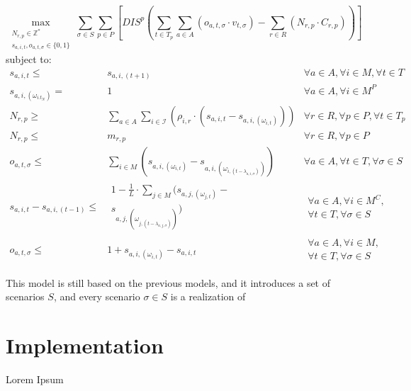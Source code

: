 \documentclass[a4paper,12pt]{article}
\begin{document}
\small
\begin{equation}
	\max_{\substack{N_{r,p} \in \mathbb{Z}^* \\ 
	s_{a,i,t}, o_{a,t,\sigma} \in \{0, 1\}}} 
	\sum_{\sigma \in S} \sum_{p \in P} [ DIS^p (\sum_{t\in T_p} \sum_{a \in A} (o_{a,t,\sigma} \cdot v_{t,\sigma})  - \sum_{r\in R} (N_{r,p} \cdot C_{r,p})) ]
\end{equation}
subject to:
\begin{align}
s_{a,i,t} \leq& s_{a,i,(t+1)}																& \forall a \in A, \forall i \in M, \forall t \in T		\\
s_{a,i,(\omega_{i.t_N})} =& 1																& \forall a \in A, \forall i \in M^P				\\
N_{r,p} \geq& \sum_{a\in A} \sum_{i\in \mathcal{I}} (\rho_{i,r} \cdot (s_{a,i,t} - s_{a,i,(\omega_{i,t})})) 					& \forall r \in R, \forall p \in P, \forall t \in T_p 		\\
N_{r,p} \leq& m_{r,p}																	& \forall r \in R, \forall p \in P 				\\
o_{a,t,\sigma} \leq& \sum_{i \in M} (s_{a,i,(\omega_{i,t})} - s_{a,i,(\omega_{i,(t-\lambda_{a,i,\sigma})})})				& \forall a \in A, \forall t \in T, \forall \sigma \in S	\\
s_{a,i,t} - s_{a,i,(t-1)} \leq& \begin{aligned} 1 - \frac{1}{L} \cdot \sum_{j \in M} (s_{a,j,(\omega_{j,t})} - \\ s_{a,j,(\omega_{j,(t-\lambda_{a,j,\sigma})})}) \end{aligned}	& \begin{aligned} \forall a \in A, \forall i \in M^C, \\ \forall t \in T, \forall \sigma \in S \end{aligned}	\\
o_{a,t,\sigma} \leq& 1 + s_{a,i,(\omega_{i,t})} - s_{a,i,t}												& \begin{aligned} \forall a \in A, \forall i \in M, \\ \forall t \in T, \forall \sigma \in S \end{aligned}
\end{align}
\normalsize

This model is still based on the previous models, and it introduces a set of scenarios $S$, and every scenario $\sigma \in S$ is a realization of 

\pagebreak

\section{Implementation}\label{s:impl}
Lorem Ipsum 
\end{document}
